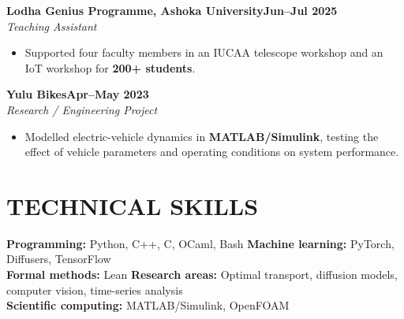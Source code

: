 \documentclass[10pt,a4paper]{article}
\newcommand{\entry}[3]{%
  \noindent\textbf{#1}\hfill\textbf{#3}\\[-1pt]
  \textit{#2}\par
}
\newenvironment{cvitems}{%
  \begin{itemize}[leftmargin=1.15em,label=\textbullet,itemsep=2.5pt,topsep=3pt,parsep=0pt,partopsep=0pt]
}{\end{itemize}}
\begin{document}
\entry{Lodha Genius Programme, Ashoka University}{Teaching Assistant}{Jun--Jul 2025}
\begin{cvitems}
  \item Supported four faculty members in an IUCAA telescope workshop and an IoT workshop for \textbf{200+ students}.
\end{cvitems}

\entry{Yulu Bikes}{Research / Engineering Project}{Apr--May 2023}
\begin{cvitems}
  \item Modelled electric-vehicle dynamics in \textbf{MATLAB/Simulink}, testing the effect of vehicle parameters and operating conditions on system performance.
\end{cvitems}

\section{TECHNICAL SKILLS}
\textbf{Programming:} Python, C++, C, OCaml, Bash \quad
\textbf{Machine learning:} PyTorch, Diffusers, TensorFlow\\[2pt]
\textbf{Formal methods:} Lean \quad
\textbf{Research areas:} Optimal transport, diffusion models, computer vision, time-series analysis\\[2pt]
\textbf{Scientific computing:} MATLAB/Simulink, OpenFOAM
\end{document}
